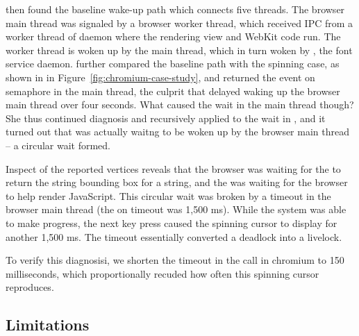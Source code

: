 \xxx then found the baseline wake-up path which connects five threads.
The browser main thread was signaled by a browser worker thread, which
received IPC from a worker thread of daemon  where the rendering view
and WebKit code run. The worker thread is woken up by the  main
thread, which in turn woken by , the font service daemon. \xxx further
compared the baseline path with the spinning case, as shown in 
in Figure~\ref{fig:chromium-case-study}, and returned the  event
on semaphore in the  main thread, the culprit that delayed
waking up the browser main thread over four seconds. What caused the wait in the
 main thread though? She thus continued diagnosis and recursively
applied \xxx to the wait in , and it turned out that  was
actually waitng to be woken up by the browser main thread -- a circular wait formed.


Inspect of the reported vertices reveals that the browser was waiting for 
the  to return the string bounding box for a string, and
the  was waiting for the browser to help render JavaScript. This
circular wait was broken by a timeout in the browser main thread (the 
on  timeout was 1,500 ms). While the system was able to make progress, the
next key press caused the spinning cursor to display for another 1,500 ms. The
timeout essentially converted a deadlock into a livelock.

To verify this diagnosisi, we shorten the
timeout in the  call in chromium
to 150 milliseconds, which proportionally recuded how often this 
spinning cursor reproduces.

\subsection{Limitations}

